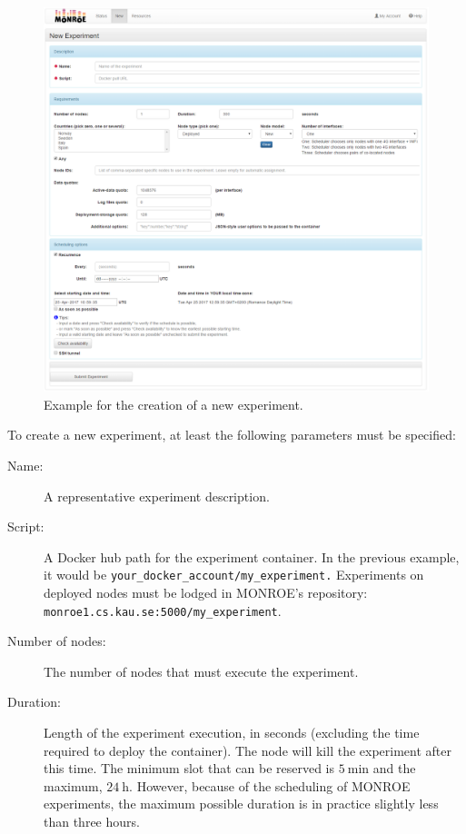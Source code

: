 \documentclass[a4paper,10pt]{article}
\newcommand{\monroe}{MONROE}
\newcommand{\identifier}[1]{{\texttt{\small{#1}}}}
\begin{document}
\begin{figure}[tp]
	\centering
	\includegraphics[width=1.0\textwidth]{NewExperiment_blank.png}
	\caption{Example for the creation of a new experiment.}
	\label{fig:newExperimentBlank}
\end{figure}

To create a new experiment, at least the following parameters must be specified:
\begin{description}
	\item [Name:] A representative experiment description.
	\item [Script:] A Docker hub path for the experiment container. In the previous example, it would be \identifier{your\_\allowbreak docker\_\allowbreak account/my\_\allowbreak experiment.} Experiments on deployed nodes must be lodged in \monroe{}'s repository: \identifier{monroe1.cs.kau.se:5000/my\_experiment}.
	\item [Number of nodes:] The number of nodes that must execute the experiment.
	\item [Duration:] Length of the experiment execution, in seconds (excluding the time required to deploy the container).
	The node will kill the experiment after this time. The minimum slot that can be reserved is $\SI{5}{\minute}$ and the maximum, $\SI{24}{\hour}$. However, because of the scheduling of \monroe{} experiments, the maximum possible duration is in practice slightly less than three hours.
\end{description}
\end{document}
